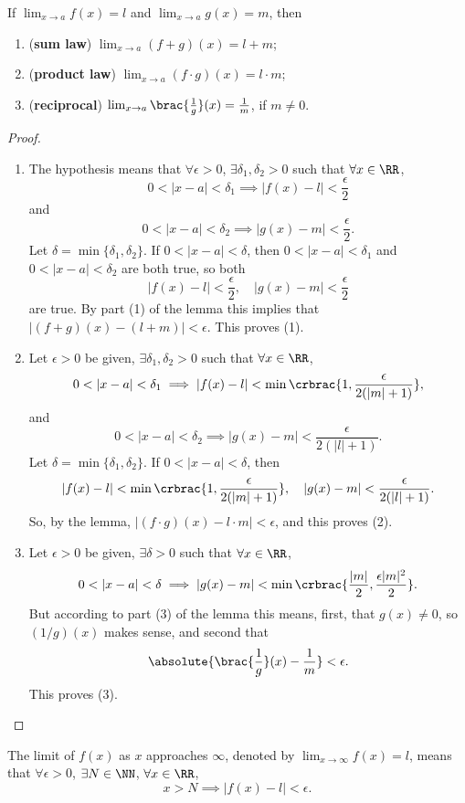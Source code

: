 \begin{theorem}\label{thrm:limit-laws}
If $\lim_{x\to a}f(x)=l$ and $\lim_{x\to a}g(x)=m$, then
\begin{enumerate}[label=(\arabic*)]
\item (\textbf{sum law}) $\lim_{x\to a}(f+g)(x)=l+m$;
\item (\textbf{product law}) $\lim_{x\to a}(f\cdot g)(x)=l\cdot m$;
\item (\textbf{reciprocal}) $\lim_{x\to a}\brac{\frac{1}{g}}(x)=\frac{1}{m}$, if $m\neq0$.
\end{enumerate}
\end{theorem}

\begin{proof} \
\begin{enumerate}[label=(\arabic*)]
\item The hypothesis means that $\forall\epsilon>0$, $\exists\delta_1,\delta_2>0$ such that $\forall x\in\RR$,
\[0<|x-a|<\delta_1\implies|f(x)-l|<\frac{\epsilon}{2}\]
and
\[0<|x-a|<\delta_2\implies|g(x)-m|<\frac{\epsilon}{2}.\]
Let $\delta=\min\{\delta_1,\delta_2\}$. If $0<|x-a|<\delta$, then $0<|x-a|<\delta_1$ and $0<|x-a|<\delta_2$ are both true, so both
\[|f(x)-l|<\frac{\epsilon}{2},\quad|g(x)-m|<\frac{\epsilon}{2}\]
are true. By part (1) of the lemma this implies that $|(f+g)(x)-(l+m)|<\epsilon$. This proves (1).

\item Let $\epsilon>0$ be given, $\exists\delta_1,\delta_2>0$ such that $\forall x\in\RR$,
\[0<|x-a|<\delta_1\implies|f(x)-l|<\min\crbrac{1,\frac{\epsilon}{2(|m|+1)}},\]
and
\[0<|x-a|<\delta_2\implies|g(x)-m|<\frac{\epsilon}{2(|l|+1)}.\]
Let $\delta=\min\{\delta_1,\delta_2\}$. If $0<|x-a|<\delta$, then
\[|f(x)-l|<\min\crbrac{1,\frac{\epsilon}{2(|m|+1)}},\quad|g(x)-m|<\frac{\epsilon}{2(|l|+1)}.\]
So, by the lemma, $|(f\cdot g)(x)-l\cdot m|<\epsilon$, and this proves (2).

\item Let $\epsilon>0$ be given, $\exists\delta>0$ such that $\forall x\in\RR$,
\[0<|x-a|<\delta\implies|g(x)-m|<\min\crbrac{\frac{|m|}{2},\frac{\epsilon|m|^2}{2}}.\]
But according to part (3) of the lemma this means, first, that $g(x)\neq0$, so $(1/g)(x)$ makes sense, and second that
\[\absolute{\brac{\frac{1}{g}}(x)-\frac{1}{m}}<\epsilon.\]
This proves (3).
\end{enumerate}
\end{proof}

\begin{definition}
The limit of $f(x)$ as $x$ approaches $\infty$, denoted by $\displaystyle\lim_{x\to\infty}f(x)=l$, means that $\forall\epsilon>0$, $\exists N\in\NN$, $\forall x\in\RR$,
\[x>N\implies|f(x)-l|<\epsilon.\]
\end{definition}

